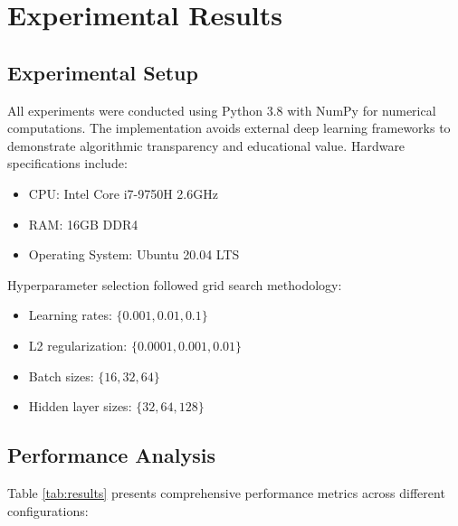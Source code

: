 \documentclass[12pt,a4paper]{article}
\begin{document}
	\section{Experimental Results}
	
	\subsection{Experimental Setup}
	
	All experiments were conducted using Python 3.8 with NumPy for numerical computations. The implementation avoids external deep learning frameworks to demonstrate algorithmic transparency and educational value. Hardware specifications include:
	
	\begin{itemize}
		\item CPU: Intel Core i7-9750H 2.6GHz
		\item RAM: 16GB DDR4
		\item Operating System: Ubuntu 20.04 LTS
	\end{itemize}
	
	Hyperparameter selection followed grid search methodology:
	\begin{itemize}
		\item Learning rates: $\{0.001, 0.01, 0.1\}$
		\item L2 regularization: $\{0.0001, 0.001, 0.01\}$
		\item Batch sizes: $\{16, 32, 64\}$
		\item Hidden layer sizes: $\{32, 64, 128\}$
	\end{itemize}
	
	\subsection{Performance Analysis}
	
	Table \ref{tab:results} presents comprehensive performance metrics across different configurations:
	
\end{document}
